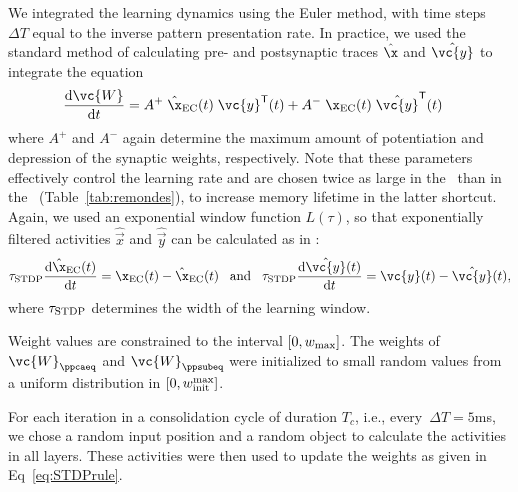 We integrated the learning dynamics using the Euler method, with time steps~$\Delta T$ equal to the inverse pattern presentation rate. In practice, we used the standard method of calculating pre- and postsynaptic traces $\hat\x$ and $\hat{\vc{y}}$ to integrate the equation
\begin{align}
\frac{\mathrm{d} \vc{W} }{\mathrm{d} t} &= A^+  \; \hat\x_{\mathrm{EC}}(t) \; \vc{y}^\mathsf{T}(t) + A^- \; \x_{\mathrm{EC}}(t)\; \hat{\vc{y}}^\mathsf{T}(t)
\label{eq:STDPrule}
\end{align}
where $A^+$ and $A^-$ again determine the maximum amount of potentiation and depression of the synaptic weights, respectively. Note that these parameters effectively control the learning rate and are chosen twice as large in the \ppca~than in the \ppsub~(Table~\ref{tab:remondes}), to increase memory lifetime in the latter shortcut. Again, we used an exponential window function $L(\tau)$, so that exponentially filtered activities $\hat{\vec{x}}$ and $\hat{\vec{y}}$ can be calculated as in \cite{Song2000}:
\begin{align}
\tau_{\rm STDP} \frac{\mathrm{d} \hat \x_{\mathrm{EC}}(t)}{\mathrm{d}t} = \x_{\mathrm{EC}}(t) - \hat \x_{\mathrm{EC}}(t) \;\;\; \mathrm{and}  \;\;\; \tau_{\rm STDP} \frac{\mathrm{d} \hat {\vc{y}}(t)}{\mathrm{d} t} = \vc{y}(t) - \hat {\vc{y}}(t), \label{eq:STDPtraces}
\end{align}
where $\tau_{\rm STDP}$ determines the width of the learning window.

Weight values are constrained to the interval $\left[0, w_{\rm max}\right]$. The weights of $\vc{W}_{\ppcaeq}$ and $\vc{W}_{\ppsubeq}$ were initialized to small random values from a uniform distribution in $\left[0,w_{\rm init}^{\rm max}\right]$.

For each iteration in a consolidation cycle of duration $T_c$, i.e., every~$\Delta T=5$ms, we chose a random input position and a random object to calculate the activities in all layers. These activities were then used to update the weights as given in Eq~\eqref{eq:STDPrule}.


